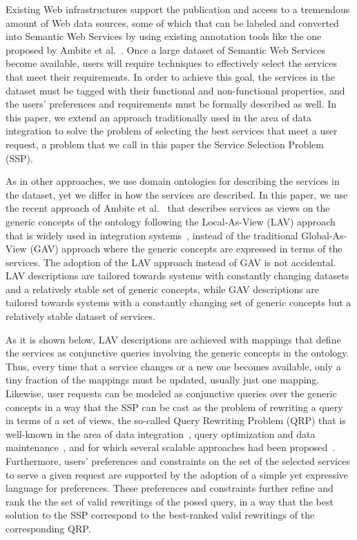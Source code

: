 \documentclass{llncs}
\begin{document}
Existing Web infrastructures support the publication and access to a
tremendous amount of Web data sources, some of which that can be labeled
and converted into Semantic Web Services by using existing annotation
tools like the one proposed by Ambite et al.\ \cite{AmbiteISWC09}.
Once a large dataset of Semantic Web Services become available, users
will require techniques to effectively select the services that meet
their requirements.
In order to achieve this goal, the services in the dataset must be
tagged with their functional and non-functional properties, and
the users' preferences and requirements must be formally described
as well.
In this paper, we extend an approach traditionally used in the area of
data integration to solve the problem of selecting the best services
that meet a user request, a problem that we call in this paper the
Service Selection Problem (SSP).

As in other approaches, we use domain ontologies for describing
the services in the dataset, yet we differ in how the services are described.
In this paper, we use the recent approach of Ambite et al.\ \cite{AmbiteISWC09}
that describes services as views on the generic concepts of the ontology
following the Local-As-View (LAV) approach that is widely used in integration
systems~\cite{levy:bucket}, instead of the traditional Global-As-View (GAV)
approach where the generic concepts are expressed in terms of the services.
The adoption of the LAV approach instead of GAV is not accidental.
LAV descriptions are tailored towards systems with constantly changing
datasets and a relatively stable set of generic concepts, while GAV
descriptions are tailored towards systems with a constantly changing
set of generic concepts but a relatively stable dataset of services.

As it is shown below, LAV descriptions are achieved with mappings
that define the services as conjunctive queries involving the generic
concepts in the ontology. Thus, every time that a service changes or
a new one becomes available, only a tiny fraction of the mappings
must be updated, usually just one mapping.
Likewise, user requests can be modeled as conjunctive queries over the
generic concepts in a way that the SSP can be cast as the problem
of rewriting a query in terms of a set of views, the so-called Query
Rewriting Problem (QRP) that is well-known in the area of data
integration~\cite{Chen05,JaudoinPRST05}, query optimization and data
maintenance~\cite{AfratiLU07,levy:bucket}, and for which several
scalable approaches had been
proposed~\cite{arvelo:aaai06,pods:DuschkaG97,sac:DuschkaG97,levy:bucket,pottinger:minicon}.
Furthermore, users' preferences and constraints on the set of the
selected services to serve a given request are supported by the
adoption of a simple yet expressive language for preferences. 
These preferences and constraints further refine and rank the
the set of valid rewritings of the posed query, in a way that
the best solution to the SSP correspond to the best-ranked 
valid rewritings of the corresponding QRP.
\end{document}
